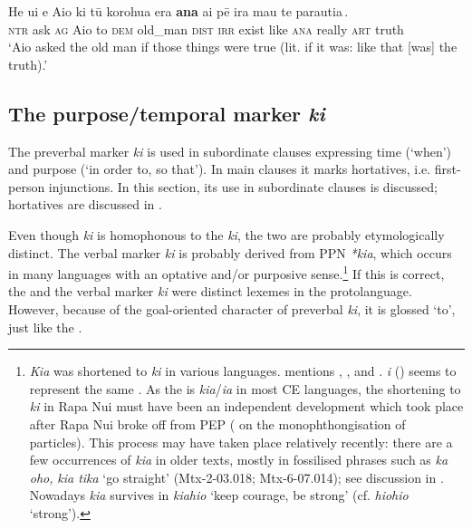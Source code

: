 \ea\label{ex:11.185}
\gll He {\ꞌ}ui e Aio ki tū korohu{\ꞌ}a era \textbf{ana} ai {\ob}pē ira mau te parauti{\ꞌ}a\,{\cb}. \\
\textsc{ntr} ask \textsc{ag} Aio to \textsc{dem} old\_man \textsc{dist} \textsc{irr} exist {\db}like \textsc{ana} really \textsc{art} truth \\

\glt 
‘Aio asked the old man if those things were true (lit. if it was: like that [was] the truth).’ \textstyleExampleref{[R532-14.016]}
\z
{}
\subsection{The purpose/temporal marker \textit{ki}}\label{sec:11.5.3}
The preverbal marker \textit{ki} is used in subordinate clauses expressing time (‘when’) and purpose (‘in order to, so that’). In main clauses it marks hortatives, i.e. first-person injunctions. In this section, its use in subordinate clauses is discussed; hortatives are discussed in . 

Even though \textit{ki} is homophonous to the  \textit{ki}, the two are probably etymologically distinct. The verbal marker \textit{ki} is probably derived from PPN \textit{*kia}, which occurs in many languages with an optative and/or purposive sense.\footnote{\label{fn:524}\textit{Kia} was shortened to \textit{ki} in various languages. \citet[30]{Clark1976} mentions , ,  and .  \textit{i} (\citealt[61]{ElbertPukui1979}) seems to represent the same . As the  is \textit{kia}/\textit{{\ꞌ}ia} in most CE languages, the shortening to \textit{ki} in Rapa Nui must have been an independent development which took place after Rapa Nui broke off from PEP ( on the monophthongisation of particles). This process may have taken place relatively recently: there are a few occurrences of \textit{kia} in older texts, mostly in fossilised phrases such as \textit{ka oho,} \textit{kia tika} ‘go straight’ (Mtx-2-03.018; Mtx-6-07.014); see discussion in \citet[429]{Fischer1994}. Nowadays \textit{kia} survives in \textit{kiahio} ‘keep courage, be strong’ (cf. \textit{hiohio} ‘strong’).}  If this is correct, the  and the verbal marker \textit{ki} were distinct lexemes in the protolanguage. However, because of the goal-oriented character of preverbal \textit{ki}, it is glossed ‘to’, just like the .

